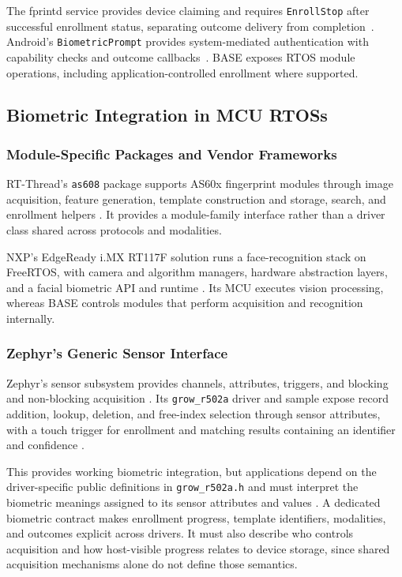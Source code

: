 The fprintd service provides device claiming and requires \texttt{EnrollStop} after successful enrollment status, separating outcome delivery from completion~\cite{fprintd_device_api}. Android's \texttt{BiometricPrompt} provides system-mediated authentication with capability checks and outcome callbacks~\cite{android_bio}. BASE exposes RTOS module operations, including application-controlled enrollment where supported.

\subsection{Biometric Integration in MCU RTOSs}

\subsubsection{Module-Specific Packages and Vendor Frameworks}

RT-Thread's \texttt{as608} package supports AS60x fingerprint modules through image acquisition, feature generation, template construction and storage, search, and enrollment helpers \cite{rtthread_as608}. It provides a module-family interface rather than a driver class shared across protocols and modalities.

NXP's EdgeReady i.MX RT117F solution runs a face-recognition stack on FreeRTOS, with camera and algorithm managers, hardware abstraction layers, and a facial biometric API and runtime \cite{nxp_rt117f_face}. Its MCU executes vision processing, whereas BASE controls modules that perform acquisition and recognition internally.

\subsubsection{Zephyr's Generic Sensor Interface}
\label{sec:sensor_limitations}

Zephyr's sensor subsystem provides channels, attributes, triggers, and blocking and non-blocking acquisition \cite{zephyr_sensor_api}. Its \texttt{grow\_r502a} driver and sample expose record addition, lookup, deletion, and free-index selection through sensor attributes, with a touch trigger for enrollment and matching results containing an identifier and confidence \cite{zephyr_r502a,zephyr_r502a_sample}.

This provides working biometric integration, but applications depend on the driver-specific public definitions in \texttt{grow\_r502a.h} and must interpret the biometric meanings assigned to its sensor attributes and values \cite{zephyr_r502a}. A dedicated biometric contract makes enrollment progress, template identifiers, modalities, and outcomes explicit across drivers. It must also describe who controls acquisition and how host-visible progress relates to device storage, since shared acquisition mechanisms alone do not define those semantics.

